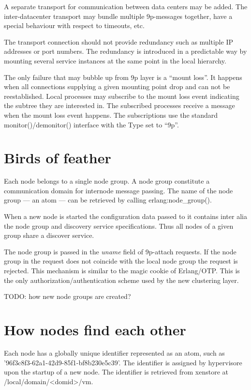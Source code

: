 \documentclass{scrartcl}
\begin{document}
A separate transport for communication between data centers may be added. The
inter-datacenter transport may bundle multiple 9p-messages together, have a
special behaviour with respect to timeouts, etc.

The transport connection should not provide redundancy such as multiple IP
addresses or port numbers. The redundancy is introduced in a predictable way by
mounting several service instances at the same point in the local hierarchy.

The only failure that may bubble up from 9p layer is a ``mount loss''. It
happens when all connections supplying a given mounting point drop and can not
be reestablished. Local processes may subscribe to the mount loss event
indicating the subtree they are interested in. The subscribed processes receive
a message when the mount loss event happens. The subscriptions use the standard
monitor()/demonitor() interface with the Type set to ``9p''.

\section*{Birds of feather}

Each node belongs to a single node group. A node group constitute a
communication domain for internode message passing. The name of the node group
--- an atom --- can be retrieved by calling erlang:node\_group().

When a new node is started the configuration data passed to it contains inter
alia the node group and discovery service specifications. Thus all nodes of
a given group share a discover service.

The node group is passed in the \emph{uname} field of 9p-attach requests. If the
node group in the request does not coincide with the local node group the
request is rejected. This mechanism is similar to the magic cookie of
Erlang/OTP. This is the only authorization/authentication scheme used by the new
clustering layer.

TODO: how new node groups are created?

\section*{How nodes find each other}

Each node has a globally unique identifier represented as an atom, such as
'96f3c8f3-62a1-42d9-85f1-bf8b230e5c39'. The identifier is assigned by
hypervisore upon the startup of a new node. The identifier is retrieved from
xenstore at /local/domain/<domid>/vm.
\end{document}
